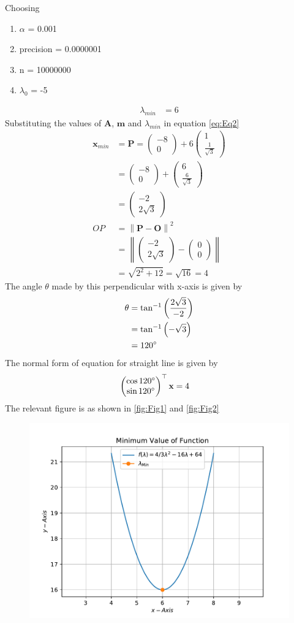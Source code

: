 \documentclass[12pt]{article}
\providecommand{\brak}[1]{\ensuremath{\left(#1\right)}}
\providecommand{\norm}[1]{\left\lVert#1\right\rVert}
\newcommand{\myvec}[1]{\ensuremath{\begin{pmatrix}#1\end{pmatrix}}}
\let\vec\mathbf
\begin{document}
\begin{enumerate}
Choosing
\begin{enumerate}
 \item $\alpha$ = 0.001
 \item precision = 0.0000001
 \item n = 10000000 
 \item $\lambda_0$ = -5 
\end{enumerate}
\begin{align}
	\lambda_{min} &= 6 
\end{align}
Substituting the values of $\vec{A}$, $\vec{m}$ and $\lambda_{min}$ in equation \eqref{eq:Eq2} 
\begin{align}
	\vec{x}_{min} &= \vec{P} = \myvec{-8 \\ 0}+6\myvec{1 \\ \frac{1}{\sqrt{3}}}  \\
	&= \myvec{-8 \\ 0}+\myvec{6 \\ \frac{6}{\sqrt{3}}} \\
	&= \myvec{-2 \\ 2\sqrt{3}} \\
	OP &= \norm{\vec{P}-\vec{O}}^2 \\ 
	&= \norm{\myvec{-2 \\ 2\sqrt{3}}-\myvec{0 \\ 0}} \\
	&= \sqrt{2^2 + 12} = \sqrt{16} = 4
\end{align}
The angle $\theta$ made by this perpendicular with x-axis is given by
\begin{align}
         \theta &= \tan^{-1}\brak{\frac{2\sqrt{3}}{-2}} \\
	 &= \tan^{-1}\brak{-\sqrt{3}} \\
	 &= 120\degree
\end{align}
The normal form of equation for straight line is given by
\begin{align}
	\myvec{\cos120\degree \\ \sin120\degree}^\top\vec{x} &= 4 
\end{align}
The relevant figure is as shown in \ref{fig:Fig1} and \ref{fig:Fig2}
\begin{figure}[!h]
	\begin{center}
		\includegraphics[width=\columnwidth]{figs/problem3.1a.pdf}

\end{center}
\end{figure}
\end{enumerate}
\end{document}

